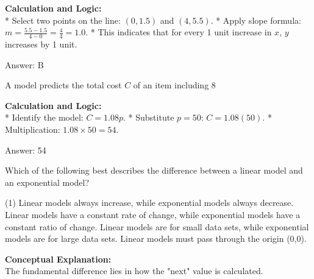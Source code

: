 \documentclass[11pt,paper=a4,answers]{exam}
\begin{document}
\begin{questions}
\begin{solution}
\vspace{30pt}

\textbf{Calculation and Logic:} \\
* Select two points on the line: $(0, 1.5)$ and $(4, 5.5)$.
* Apply slope formula: $m = \frac{5.5 - 1.5}{4 - 0} = \frac{4}{4} = 1.0$.
* This indicates that for every 1 unit increase in $x$, $y$ increases by 1 unit.

\vspace{30pt}

Answer: \colorbox{yellow!100}{B}
\end{solution}

\vspace{60pt}

\question
A model predicts the total cost $C$ of an item including 8%

\begin{solution}
\textbf{Calculation and Logic:} \\
* Identify the model: $C = 1.08p$.
* Substitute $p = 50$: $C = 1.08(50)$.
* Multiplication: $1.08 \times 50 = 54$.

\vspace{30pt}

Answer: \colorbox{yellow!100}{54}
\end{solution}

\vspace{60pt}

\question
Which of the following best describes the difference between a linear model and an exponential model?
\begin{tasks}(1)
    \task Linear models always increase, while exponential models always decrease.
    \task Linear models have a constant rate of change, while exponential models have a constant ratio of change.
    \task Linear models are for small data sets, while exponential models are for large data sets.
    \task Linear models must pass through the origin (0,0).
\end{tasks}

\begin{solution}
\textbf{Conceptual Explanation:} \\
The fundamental difference lies in how the "next" value is calculated.


\end{solution}
\end{questions}
\end{document}
